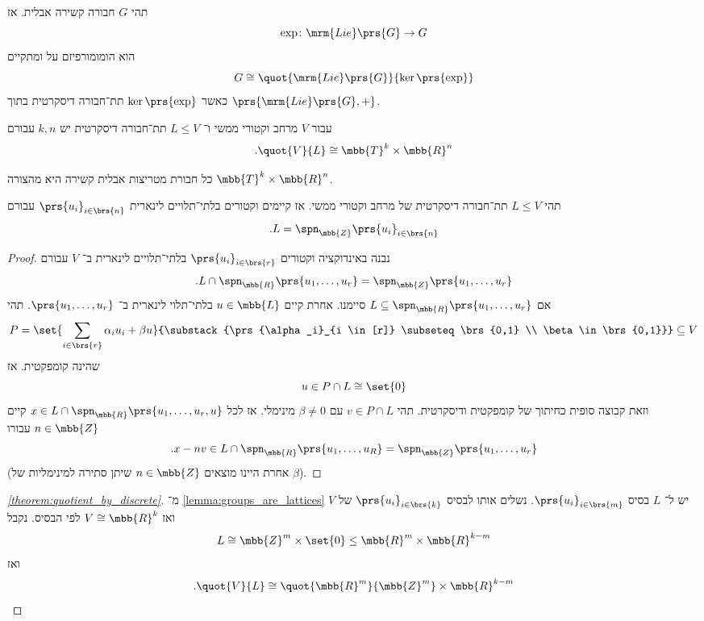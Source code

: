 \documentclass[10pt, twoside]{book}
\begin{document}
\begin{proposition}
תהי
$G$
חבורה קשירה אבלית. אז
\[\exp \colon \mrm{Lie}\prs{G} \to G\]
הוא הומומורפיזם על ומתקיים
\[G \cong \quot{\mrm{Lie}\prs{G}}{\ker\prs{\exp}}\]
כאשר
$\ker\prs{\exp}$
תת־חבורה דיסקרטית בתוך
$\prs{\mrm{Lie}\prs{G}, +}$.
\end{proposition}

\begin{theorem}\label{theorem:quotient_by_discrete}
עבור
$V$
מרחב וקטורי ממשי ו־%
$L \leq V$
תת־חבורה דיסקרטית יש
$k,n$
עבורם
\[\text{.} \quot{V}{L} \cong \mbb{T}^k \times \mbb{R}^n\]
\end{theorem}

\begin{corollary}
כל חבורת מטריצות אבלית קשירה היא מהצורה
$\mbb{T}^k \times \mbb{R}^n$.
\end{corollary}

\begin{lemma}\label{lemma:groups_are_lattices}
תהי
$L \leq V$
תת־חבורה דיסקרטית של מרחב וקטורי ממשי. אז קיימים וקטורים בלתי־תלויים לינארית
$\prs{u_i}_{i \in \brs{n}}$
עבורם
\[\text{.} L = \spn_{\mbb{Z}}\prs{u_i}_{i \in \brs{n}}\]
\end{lemma}

\begin{proof}
נבנה באינדוקציה וקטורים
$\prs{u_i}_{i \in \brs{r}}$
בלתי־תלויים לינארית ב־%
$V$
עבורם
\[\text{.} L \cap \spn_{\mbb{R}}\prs{u_1, \ldots, u_r} = \spn_{\mbb{Z}} \prs{u_1, \ldots, u_r}\]
אם
$L \subseteq \spn_{\mbb{R}} \prs{u_1, \ldots, u_r}$
סיימנו.
אחרת קיים
$u \in \mbb{L}$
בלתי־תלוי לינארית ב־%
$\prs{u_1, \ldots, u_r}$.
תהי
\[P = \set{\sum_{i \in \brs{r}} \alpha_i u_i + \beta u}{\substack{\prs{\alpha_i}_{i \in [r]} \subseteq \brs{0,1} \\ \beta \in \brs{0,1}}} \subseteq V\]
שהינה קומפקטית.
אז
\[u \in P \cap L \cong \set{0}\]
וזאת קבוצה סופית כחיתוך של קומפקטית ודיסקרטית.
תהי
$v \in P \cap L$
עם
$\beta \neq 0$
מינימלי.
אז לכל
$x \in L \cap \spn_{\mbb{R}}\prs{u_1, \ldots, u_r, u}$
קיים
$n \in \mbb{Z}$
עבורו
\[\text{.} x - nv \in L \cap \spn_{\mbb{R}}\prs{u_1, \ldots, u_R} = \spn_{\mbb{Z}}\prs{u_1, \ldots, u_r}\]
(אחרת היינו מוצאים
$n \in \mbb{Z}$
שיתן סתירה למינימליות של
$\beta$).
\end{proof}

\begin{proof}[\ref{theorem:quotient_by_discrete}]
מ־%
\ref{lemma:groups_are_lattices}
יש ל־%
$L$
בסיס
$\prs{u_i}_{i \in \brs{m}}$.
נשלים אותו לבסיס
$\prs{u_i}_{i \in \brs{k}}$
של
$V$
ואז
$V \cong \mbb{R}^k$
לפי הבסיס. נקבל
\[L \cong \mbb{Z}^m \times \set{0} \leq \mbb{R}^m \times \mbb{R}^{k-m}\]
ואז
\[\text{.} \quot{V}{L} \cong \quot{\mbb{R}^m}{\mbb{Z}^m} \times \mbb{R}^{k-m}\]
\end{proof}
\end{document}

